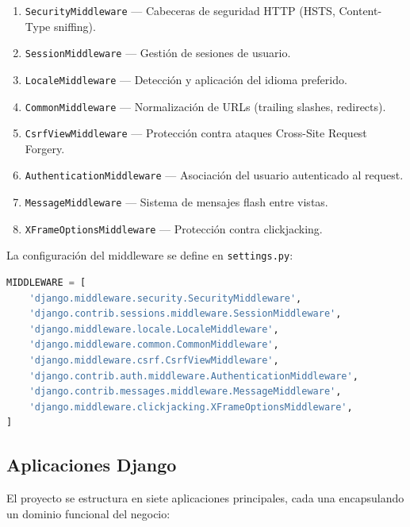 \documentclass[12pt, a4paper]{article}
\begin{document}
\begin{enumerate}
    \item \texttt{SecurityMiddleware} --- Cabeceras de seguridad HTTP (HSTS, Content-Type sniffing).
    \item \texttt{SessionMiddleware} --- Gestión de sesiones de usuario.
    \item \texttt{LocaleMiddleware} --- Detección y aplicación del idioma preferido.
    \item \texttt{CommonMiddleware} --- Normalización de URLs (trailing slashes, redirects).
    \item \texttt{CsrfViewMiddleware} --- Protección contra ataques Cross-Site Request Forgery.
    \item \texttt{AuthenticationMiddleware} --- Asociación del usuario autenticado al request.
    \item \texttt{MessageMiddleware} --- Sistema de mensajes flash entre vistas.
    \item \texttt{XFrameOptionsMiddleware} --- Protección contra clickjacking.
\end{enumerate}

La configuración del middleware se define en \texttt{settings.py}:

\begin{lstlisting}[language=Python, caption={Stack de Middleware en settings.py}]
MIDDLEWARE = [
    'django.middleware.security.SecurityMiddleware',
    'django.contrib.sessions.middleware.SessionMiddleware',
    'django.middleware.locale.LocaleMiddleware',
    'django.middleware.common.CommonMiddleware',
    'django.middleware.csrf.CsrfViewMiddleware',
    'django.contrib.auth.middleware.AuthenticationMiddleware',
    'django.contrib.messages.middleware.MessageMiddleware',
    'django.middleware.clickjacking.XFrameOptionsMiddleware',
]
\end{lstlisting}

\subsection{Aplicaciones Django}

El proyecto se estructura en siete aplicaciones principales, cada una encapsulando un dominio funcional del negocio:
\end{document}
